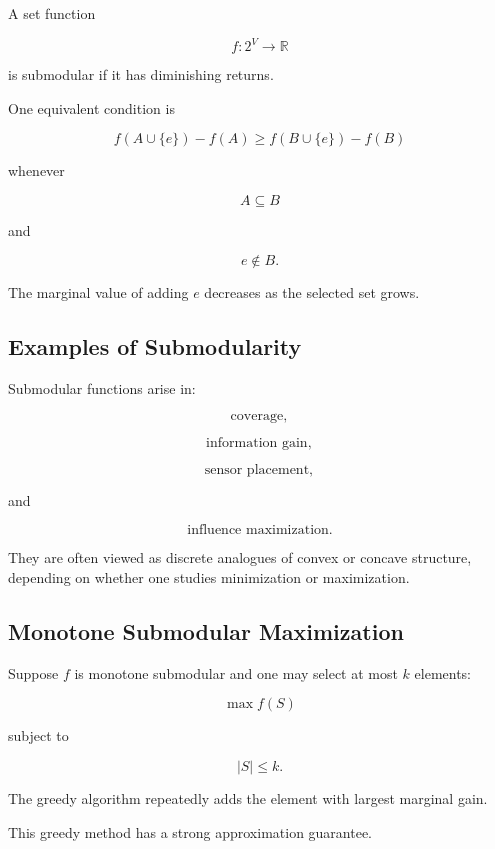 A set function

\[
f:2^V\to\mathbb{R}
\]

is submodular if it has diminishing returns.

One equivalent condition is

\[
\boxed{
f(A\cup\{e\})-f(A)
\geq
f(B\cup\{e\})-f(B)
}
\]

whenever

\[
A\subseteq B
\]

and

\[
e\notin B.
\]

The marginal value of adding \(e\) decreases as the selected set grows.

\subsection{Examples of Submodularity}
\label{subsec:examples-submodularity}

Submodular functions arise in:

\[
\boxed{
\text{coverage},
}
\]

\[
\boxed{
\text{information gain},
}
\]

\[
\boxed{
\text{sensor placement},
}
\]

and

\[
\boxed{
\text{influence maximization}.
}
\]

They are often viewed as discrete analogues of convex or concave
structure, depending on whether one studies minimization or maximization.

\subsection{Monotone Submodular Maximization}
\label{subsec:monotone-submodular-maximization}

Suppose \(f\) is monotone submodular and one may select at most \(k\)
elements:

\[
\boxed{
\max
f(S)
}
\]

subject to

\[
\boxed{
|S|\leq k.
}
\]

The greedy algorithm repeatedly adds the element with largest marginal
gain.

This greedy method has a strong approximation guarantee.

